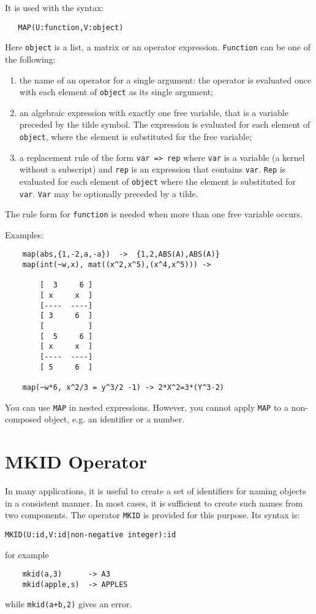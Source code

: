 It is used with the syntax:
\begin{verbatim}
   MAP(U:function,V:object)
\end{verbatim}
Here {\tt object} is a list, a matrix or an operator expression.
{\tt Function} can be one of the following:
\begin{enumerate}
\item the name of an operator for a single argument: the operator
is evaluated once with each element of {\tt object} as its single argument;
\item an algebraic expression with exactly one free variable, that is
a variable preceded by the tilde symbol. The expression
is evaluated for each element of {\tt object}, where the element is
substituted for the free variable;
\item a replacement rule of the form {\tt var => rep}
where {\tt var} is a variable (a kernel without a subscript)
and {\tt rep} is an expression that contains {\tt var}.
{\tt Rep} is evaluated for each element of {\tt object} where
the element is substituted for  {\tt var}. {\tt Var} may be
optionally preceded by a tilde.
\end{enumerate}
The rule form  for {\tt function} is needed when more than
one free variable occurs.

Examples:
\begin{verbatim}
	map(abs,{1,-2,a,-a})  ->  {1,2,ABS(A),ABS(A)}
	map(int(~w,x), mat((x^2,x^5),(x^4,x^5))) ->

		[  3     6 ]
		[ x     x  ]
		[----  ----]
		[ 3     6  ]
		[          ]
		[  5     6 ]
		[ x     x  ]
		[----  ----]
		[ 5     6  ]

	map(~w*6, x^2/3 = y^3/2 -1) -> 2*X^2=3*(Y^3-2)
\end{verbatim}

You can use {\tt MAP} in nested expressions. However, you cannot
apply {\tt MAP} to a non-composed object, e.g. an identifier or a number.


\section{MKID Operator}
\hypertarget{operator:MKID}{}
In many applications, it is useful to create a set of identifiers for
naming objects in a consistent manner. In most cases, it is sufficient to
create such names from two components. The operator {\tt MKID} is provided
for this purpose. Its syntax is:
\begin{verbatim}
MKID(U:id,V:id|non-negative integer):id
\end{verbatim}
for example
\begin{verbatim}
	mkid(a,3)      -> A3
	mkid(apple,s)  -> APPLES
\end{verbatim}
while {\tt mkid(a+b,2)} gives an error.

